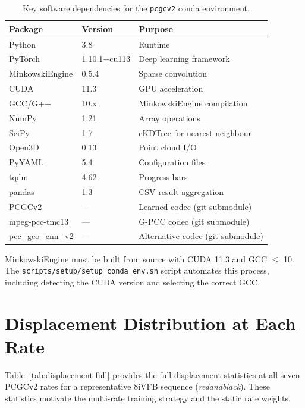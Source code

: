 \begin{table}[h]
  \centering
  \caption{Key software dependencies for the \texttt{pcgcv2} conda environment.}
  \label{tab:dependencies}
  \small
  \begin{tabular}{lll}
    \toprule
    \textbf{Package} & \textbf{Version} & \textbf{Purpose} \\
    \midrule
    Python & 3.8 & Runtime \\
    PyTorch & 1.10.1+cu113 & Deep learning framework \\
    MinkowskiEngine & 0.5.4 & Sparse convolution \\
    CUDA & 11.3 & GPU acceleration \\
    GCC/G++ & 10.x & MinkowskiEngine compilation \\
    NumPy & 1.21 & Array operations \\
    SciPy & 1.7 & cKDTree for nearest-neighbour \\
    Open3D & 0.13 & Point cloud I/O \\
    PyYAML & 5.4 & Configuration files \\
    tqdm & 4.62 & Progress bars \\
    pandas & 1.3 & CSV result aggregation \\
    \midrule
    PCGCv2 & --- & Learned codec (git submodule) \\
    mpeg-pcc-tmc13 & --- & G-PCC codec (git submodule) \\
    pcc\_geo\_cnn\_v2 & --- & Alternative codec (git submodule) \\
    \bottomrule
  \end{tabular}
\end{table}

MinkowskiEngine must be built from source with CUDA 11.3 and GCC $\leq$ 10.
The \texttt{scripts/setup/setup\_conda\_env.sh} script automates this process,
including detecting the CUDA version and selecting the correct GCC.

\section{Displacement Distribution at Each Rate}
\label{app:displacement}

Table~\ref{tab:displacement-full} provides the full displacement statistics
at all seven PCGCv2 rates for a representative 8iVFB sequence (\textit{redandblack}).
These statistics motivate the multi-rate training strategy and the static
rate weights.

